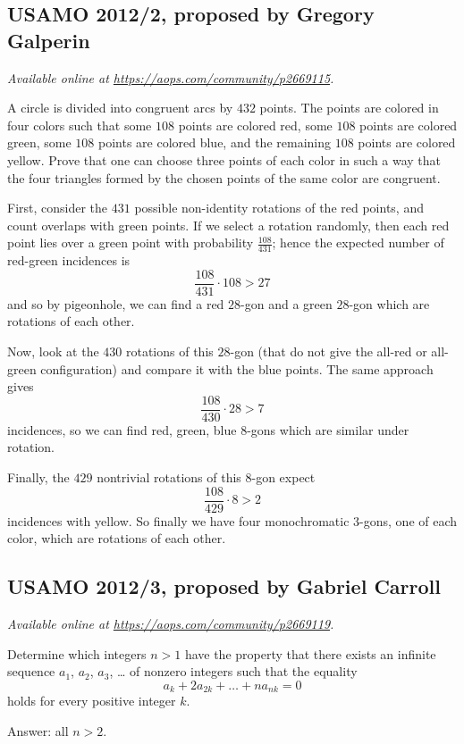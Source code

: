 \documentclass[11pt]{scrartcl}
\begin{document}
\subsection{USAMO 2012/2, proposed by Gregory Galperin}
\textsl{Available online at \url{https://aops.com/community/p2669115}.}
\begin{mdframed}[style=mdpurplebox,frametitle={Problem statement}]
A circle is divided into congruent arcs by $432$ points.
The points are colored in four colors such that
some $108$ points are colored red,
some $108$ points are colored green,
some $108$ points are colored blue,
and the remaining $108$ points are colored yellow.
Prove that one can choose three points of each color in such a way
that the four triangles formed by the chosen points
of the same color are congruent.
\end{mdframed}
First, consider the $431$ possible non-identity rotations
of the red points, and count overlaps with green points.
If we select a rotation randomly,
then each red point lies over a green point
with probability $\frac{108}{431}$;
hence the expected number of red-green incidences is
\[ \frac{108}{431} \cdot 108 > 27 \]
and so by pigeonhole, we can find a red $28$-gon
and a green $28$-gon which are rotations of each other.

Now, look at the $430$ rotations of this $28$-gon
(that do not give the all-red or all-green configuration)
and compare it with the blue points.
The same approach gives
\[ \frac{108}{430} \cdot 28 > 7 \]
incidences, so we can find red, green, blue $8$-gons
which are similar under rotation.

Finally, the $429$ nontrivial rotations of this $8$-gon expect
\[ \frac{108}{429} \cdot 8 > 2 \]
incidences with yellow.
So finally we have four monochromatic $3$-gons,
one of each color, which are rotations of each other.
\pagebreak

\subsection{USAMO 2012/3, proposed by Gabriel Carroll}
\textsl{Available online at \url{https://aops.com/community/p2669119}.}
\begin{mdframed}[style=mdpurplebox,frametitle={Problem statement}]
Determine which integers $n > 1$ have the property
that there exists an infinite sequence $a_1$, $a_2$, $a_3$, \dots
of nonzero integers such that the equality
\[ a_k + 2a_{2k} + \dots + na_{nk} = 0 \]
holds for every positive integer $k$.
\end{mdframed}
Answer: all $n > 2$.
\end{document}
